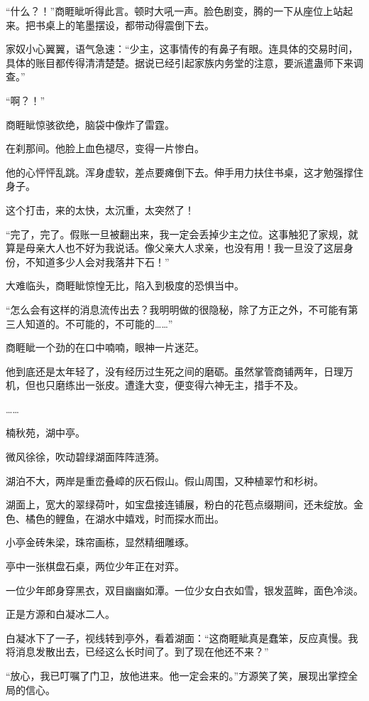 \begin{this_body}
“什么？！”商睚眦听得此言。顿时大吼一声。脸色剧变，腾的一下从座位上站起来。把书桌上的笔墨摆设，都带动得震倒下去。

家奴小心翼翼，语气急速：“少主，这事情传的有鼻子有眼。连具体的交易时间，具体的账目都传得清清楚楚。据说已经引起家族内务堂的注意，要派遣蛊师下来调查。”

“啊？！”

商睚眦惊骇欲绝，脑袋中像炸了雷霆。

在刹那间。他脸上血色褪尽，变得一片惨白。

他的心怦怦乱跳。浑身虚软，差点要瘫倒下去。伸手用力扶住书桌，这才勉强撑住身子。

这个打击，来的太快，太沉重，太突然了！

“完了，完了。假账一旦被翻出来，我一定会丢掉少主之位。这事触犯了家规，就算是母亲大人也不好为我说话。像父亲大人求亲，也没有用！我一旦没了这层身份，不知道多少人会对我落井下石！”

大难临头，商睚眦惊惶无比，陷入到极度的恐惧当中。

“怎么会有这样的消息流传出去？我明明做的很隐秘，除了方正之外，不可能有第三人知道的。不可能的，不可能的……”

商睚眦一个劲的在口中喃喃，眼神一片迷茫。

他到底还是太年轻了，没有经历过生死之间的磨砺。虽然掌管商铺两年，日理万机，但也只磨练出一张皮。遭逢大变，便变得六神无主，措手不及。

……

楠秋苑，湖中亭。

微风徐徐，吹动碧绿湖面阵阵涟漪。

湖泊不大，两岸是重峦叠嶂的灰石假山。假山周围，又种植翠竹和杉树。

湖面上，宽大的翠绿荷叶，如宝盘接连铺展，粉白的花苞点缀期间，还未绽放。金色、橘色的鲤鱼，在湖水中嬉戏，时而探水而出。

小亭金砖朱梁，珠帘画栋，显然精细雕琢。

亭中一张棋盘石桌，两位少年正在对弈。

一位少年郎身穿黑衣，双目幽幽如潭。一位少女白衣如雪，银发蓝眸，面色冷淡。

正是方源和白凝冰二人。

白凝冰下了一子，视线转到亭外，看着湖面：“这商睚眦真是蠢笨，反应真慢。我将消息发散出去，已经这么长时间了。到了现在他还不来？”

“放心，我已叮嘱了门卫，放他进来。他一定会来的。”方源笑了笑，展现出掌控全局的信心。


\end{this_body}
